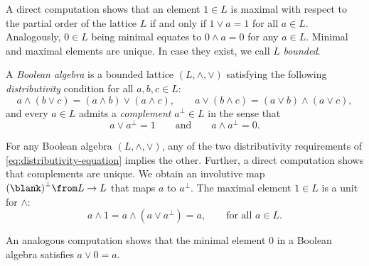 A direct computation shows that an element \(1 \in L\) is maximal with respect to the partial order of the lattice \(L\) if and only if \(1 \lor a = 1\)  for all \(a \in L\).
Analogously, \(0 \in L\) being minimal equates to \(0\land a = 0\) for any \(a\in L\).
Minimal and maximal elements are unique.
In case they exist, we call \(L\) \emph{bounded}.

\begin{definition}\label{def:Boolean-algebra}
  A \emph{Boolean algebra} is a bounded lattice \((L, \land, \lor)\) satisfying the following \emph{distributivity}
  condition for all \(a,b,c\in L\):
  \begin{equation}\label{eq:distributivity-equation}
    a \land (b \lor c) = (a \land b) \lor (a \land c),\qquad
    a \lor (b \land c) = (a \lor b) \land (a \lor c),
  \end{equation}
  and every \(a\in L\) admits a \emph{complement} \(a^{\perp}\in L\) in the sense that
  \[
    a \lor a^{\perp} = 1
    \qquad\text{and}\qquad
    a \land a^{\perp} = 0.
  \]
\end{definition}

\begin{remark}
  For any Boolean algebra \((L, \land, \lor)\),
  any of the two distributivity requirements of \cref{eq:distributivity-equation} implies the other.
  Further, a direct computation shows that complements are unique.
  We obtain an involutive map \({( \blank )}^{\perp} \from L \to L\) that maps \(a\) to \(a^{\bot}\).
  The maximal element \(1 \in L\) is a unit for \(\land\):
  \[
    a \land 1 = a \land (a \lor a^{\bot}) = a, \qquad \text{for all } a \in L.
  \]

  An analogous computation shows that the minimal element \(0\) in a Boolean algebra satisfies \(a \lor 0 = a\).
\end{remark}


